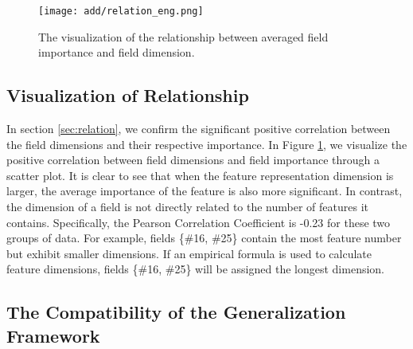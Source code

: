 \documentclass[sigconf]{acmart}
\begin{document}
\begin{figure}[h]
\centering
    \texttt{[image: add/relation\_eng.png]}
    \caption{The visualization of the relationship between averaged field importance and field dimension.}
\label{fig:relation}
\end{figure}

\subsection{Visualization of Relationship}

In section \ref{sec:relation}, we confirm the significant positive correlation between the field dimensions and their respective importance. In Figure \ref{fig:relation}, we visualize the positive correlation between field dimensions and field importance through a scatter plot. It is clear to see that when the feature representation dimension is larger, the average importance of the feature is also more significant. In contrast, the dimension of a field is not directly related to the number of features it contains. Specifically, the Pearson Correlation Coefficient is -0.23 for these two groups of data. For example, fields \{\#16, \#25\} contain the most feature number but exhibit smaller dimensions. If an empirical formula is used to calculate feature dimensions, fields \{\#16, \#25\} will be assigned the longest dimension. 





\subsection{The Compatibility of the Generalization Framework}
\end{document}
